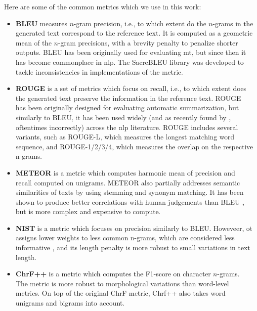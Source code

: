{Here are some of the common metrics which we use in this work:

\begin{itemize}
    \item \textbf{BLEU} \cite{papineni2002bleu} measures $n$-gram precision, i.e., to which extent do the $n$-grams in the generated text correspond to the reference text.  It is computed as a geometric mean of the $n$-gram precisions, with a brevity penalty to penalize shorter outputs. BLEU has been originally used for evaluating \ac{mt}, but since then it has become commonplace in \ac{nlp}. The SacreBLEU library \cite{post2018call}  was developed to tackle inconsistencies in implementations of the metric.
    \item \textbf{ROUGE} \cite{lin-2004-rouge} is a set of metrics which focus on recall, i.e., to which extent does the generated text preserve the information in the reference text. ROUGE has been originally designed for evaluating automatic summarization, but similarly to BLEU, it has been used widely (and as recently found by \citet{gruskyRogueScores2023}, oftentimes incorrectly) across the \ac{nlp} literature. ROUGE includes several variants, such as ROUGE-L, which measures the longest matching word sequence, and ROUGE-{1/2/3/4}, which measures the overlap on the respective n-grams.
    \item \textbf{METEOR} \cite{banerjee-lavie-2005-meteor} is a metric which computes harmonic mean of precision and recall computed on unigrams. METEOR also partially addresses semantic similarities of texts by using stemming and synonym matching. It has been shown to produce better correlations with human judgements than BLEU \cite{agarwal2008meteor}, but is more complex and expensive to compute.
    \item \textbf{NIST} \cite{martin2000nist} is a metric which focuses on precision similarly to BLEU. Howeveer, ot assigns lower weights to less common n-grams, which are considered less informative \cite{doddington2002automatic}, and its length penalty is more robust to small variations in text length.
    \item \textbf{ChrF++} \cite{popovic2015chrf,popovic2017chrf} is a metric which computes the F1-score on character $n$-grams. The metric is more robust to morphological variations than word-level metrics. On top of the original ChrF metric, Chrf++ also takes word unigrams and bigrams into account.
\end{itemize}
}
